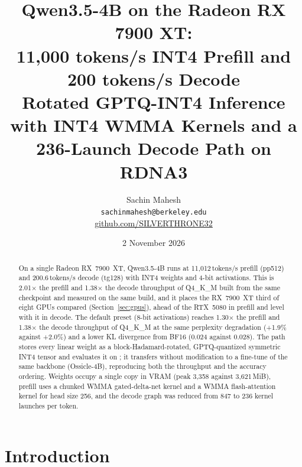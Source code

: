 \documentclass[10.5pt,a4paper]{article}
\title{\textbf{Qwen3.5-4B on the Radeon RX 7900 XT:\\ 11{,}000 tokens/s INT4 Prefill and 200 tokens/s Decode}\\[4pt]
\large Rotated GPTQ-INT4 Inference with INT4 WMMA Kernels and a 236-Launch Decode Path on RDNA3}
\author{Sachin Mahesh\\ \texttt{sachinmahesh@berkeley.edu}\\ \href{https://github.com/SILVERTHRONE32}{github.com/SILVERTHRONE32}}
\date{2 November 2026}
\newcommand{\tx}[1]{\texttt{\detokenize{#1}}}
\begin{document}
\maketitle
\vspace{-0.9cm}

\begin{abstract}
\noindent
On a single Radeon RX~7900~XT, Qwen3.5-4B runs at 11{,}012\,tokens/s prefill (pp512) and 200.6\,tokens/s decode (tg128) with INT4 weights and 4-bit activations. This is 2.01$\times$ the prefill and
1.38$\times$ the decode throughput of Q4\_K\_M built from the same checkpoint and measured on the same build, and it places the RX~7900~XT third of eight GPUs compared (Section~\ref{sec:gpus}), ahead of the
RTX~5080 in prefill and level with it in decode. The default preset (8-bit activations) reaches 1.30$\times$ the prefill and 1.38$\times$ the decode throughput of Q4\_K\_M at the same perplexity degradation
(+1.9\% against +2.0\%) and a lower KL divergence from BF16 (0.024 against 0.028). The path stores every linear weight as a block-Hadamard-rotated, GPTQ-quantized symmetric INT4 tensor and evaluates it on
\tx{v_wmma_i32_16x16x16_iu4}; it transfers without modification to a fine-tune of the same backbone (Ossicle-4B), reproducing both the throughput and the accuracy ordering. Weights occupy a single copy in VRAM
(peak 3{,}358 against 3{,}621\,MiB), prefill uses a chunked WMMA gated-delta-net kernel and a WMMA flash-attention kernel for head size 256, and the decode graph was reduced from 847 to 236 kernel launches per token.
\end{abstract}

\section{Introduction}
\end{document}
